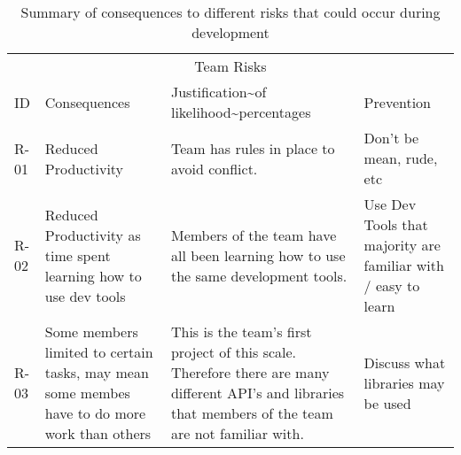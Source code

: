 \begin{table}
    \centering
    \caption{Summary of consequences to different risks that could occur during development}
    \begin{tabular}{llll}
        \multicolumn{4}{c}{Team Risks}                                                                                                                                                                                                                                                                                                                                                                                                                                                   \\
        ID   & Consequences                                                                                 & Justification\textasciitilde{}of likelihood\textasciitilde{}percentages                                                                                                                                                                                                & Prevention                                                                                        \\
        R-01 & Reduced Productivity                                                                         & Team has rules in place to avoid conflict.                                                                                                                                                                                                                             & Don’t be mean, rude, etc                                                                          \\
        R-02 & Reduced Productivity as time spent learning how to use dev tools                             & Members of the team have all been learning how to use the same development tools.                                                                                                                                                                                      & Use Dev Tools that majority are familiar with / easy to learn                                     \\
        R-03 & Some members limited to certain tasks, may mean some membes have to do more work than others & This is the team's first project of this scale. Therefore there are many different API’s and libraries that members of the team are not familiar with.                                                                                                                 & Discuss what libraries may be used                                                                \\

\end{tabular}
\end{table}
